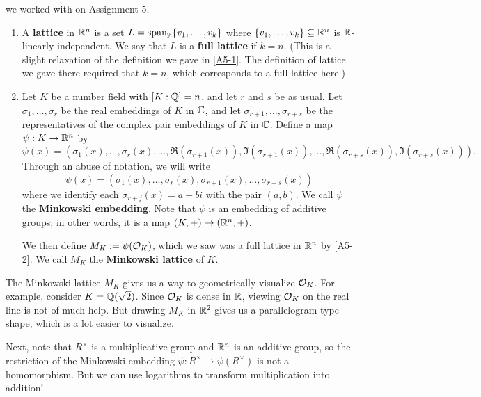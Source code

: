 we worked with on Assignment 5.
\begin{enumerate}[(1)]
    \item A {\bf lattice} in $\mathbb{R}^n$ is a set $L = \operatorname{span}_{\mathbb{Z}}\{v_1, \dots, v_k\}$
    where $\{v_1, \dots, v_k\} \subseteq \mathbb{R}^n$ is $\mathbb{R}$-linearly independent. 
    We say that $L$ is a {\bf full lattice} if $k = n$. (This is a slight 
    relaxation of the definition we gave in \ref{A5-1}. The definition of 
    lattice we gave there required that $k = n$, which corresponds to 
    a full lattice here.)
    \item Let $K$ be a number field with $[K : \mathbb{Q}] = n$, and let $r$ and 
    $s$ be as usual. Let $\sigma_1, \dots, \sigma_r$ be the real embeddings 
    of $K$ in $\mathbb{C}$, and let $\sigma_{r+1}, \dots, \sigma_{r+s}$ be the 
    representatives of the complex pair embeddings of $K$ in $\mathbb{C}$. 
    Define a map $\psi : K \to \mathbb{R}^n$ by 
    \[ \psi(x) = (\sigma_1(x), \dots, \sigma_r(x), \dots, \Re(\sigma_{r+1}(x)), 
    \Im(\sigma_{r+1}(x)), \dots, \Re(\sigma_{r+s}(x)), \Im(\sigma_{r+s}(x))). \]
    Through an abuse of notation, we will write 
    \[ \psi(x) = (\sigma_1(x), \dots, \sigma_r(x), \sigma_{r+1}(x), \dots, \sigma_{r+s}(x)) \] 
    where we identify each $\sigma_{r+j}(x) = a + bi$ with the pair $(a, b)$.
    We call $\psi$ the {\bf Minkowski embedding}. Note that $\psi$ is 
    an embedding of additive groups; in other words, it is a map 
    $(K, +) \to (\mathbb{R}^n, +)$. 

    We then define $M_K := \psi({\cal O}_K)$, which we saw was a full lattice 
    in $\mathbb{R}^n$ by \ref{A5-2}. We call $M_K$ the {\bf Minkowski lattice} of $K$.
\end{enumerate}
The Minkowski lattice $M_K$ gives us a way to geometrically 
visualize ${\cal O}_K$. For example, consider $K = \mathbb{Q}(\sqrt{2})$. 
Since ${\cal O}_K$ is dense in $\mathbb{R}$, viewing ${\cal O}_K$ on the real line is not of much help. 
But drawing $M_K$ in $\mathbb{R}^2$ gives us a parallelogram type shape, which is a 
lot easier to visualize.

Next, note that $R^\times$ is a multiplicative group and $\mathbb{R}^n$ is an additive 
group, so the restriction of the Minkowski embedding $\psi : R^\times \to 
\psi(R^\times)$ is not a homomorphism. But we can use logarithms to transform 
multiplication into addition!


